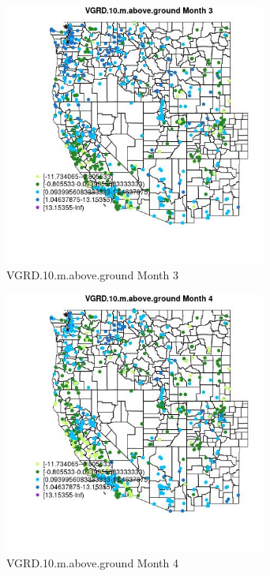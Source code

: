 \begin{figure} 
\centering  
\includegraphics[width=0.77\textwidth]{Code_Outputs/Report_ML_input_PM25_Step4_part_f_de_duplicated_aveswNAs_MapObsMo3VGRD10maboveground.jpg} 
\caption{\label{fig:Report_ML_input_PM25_Step4_part_f_de_duplicated_aveswNAsMapObsMo3VGRD10maboveground}VGRD.10.m.above.ground Month 3} 
\end{figure} 
 

\clearpage 

\begin{figure} 
\centering  
\includegraphics[width=0.77\textwidth]{Code_Outputs/Report_ML_input_PM25_Step4_part_f_de_duplicated_aveswNAs_MapObsMo4VGRD10maboveground.jpg} 
\caption{\label{fig:Report_ML_input_PM25_Step4_part_f_de_duplicated_aveswNAsMapObsMo4VGRD10maboveground}VGRD.10.m.above.ground Month 4} 
\end{figure} 
 

